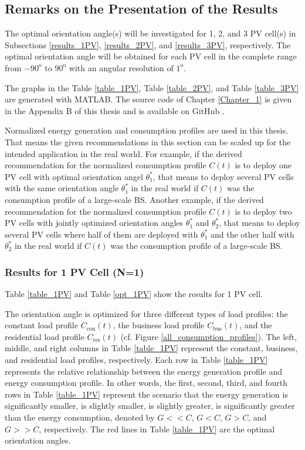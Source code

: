 \subsection{Remarks on the Presentation of the Results\label{results_load_shape}}
The optimal orientation angle(s) will be investigated for 1, 2, and 3 PV cell(s) in Subsections \ref{results_1PV}, \ref{results_2PV}, and \ref{results_3PV}, respectively. The optimal orientation angle will be obtained for each PV cell in the complete range from $- 90^\mathrm{o}$ to $90^\mathrm{o}$ with an angular resolution of $1^\mathrm{o}$.

The graphs in the Table \ref{table_1PV}, Table \ref{table_2PV}, and Table \ref{table_3PV} are generated with MATLAB. The source code of Chapter \ref{Chapter_1} is given in the Appendix B of this thesis and is available on GitHub \cite{DOBEN_GITHUB}.


Normalized energy generation and consumption profiles are used in this thesis. That means the given recommendations in this section can be scaled up for the intended application in the real world. For example, if the derived recommendation for the normalized consumption profile $C(t)$ is to deploy one PV cell with optimal orientation angel $\theta_1^*$,  
that means to deploy several PV cells with the same orientation angle $\theta_1^*$ in the real world if $C(t)$ was the consumption profile of a large-scale BS. Another example, if the derived recommendation for the normalized consumption profile $C(t)$ is to deploy two PV cells with jointly optimized orientation angles $\theta_1^*$ and $\theta_2^*$, that means to deploy several PV cells where half of them are deployed with $\theta_1^*$ and the other half with $\theta_2^*$ in the real world if $C(t)$ was the consumption profile of a large-scale BS. 


\subsubsection{Results for 1 PV Cell (N=1) \label{results_1PV}}

Table \ref{table_1PV} and Table \ref{opt_1PV} show the results for 1 PV cell.

The orientation angle is optimized for three different types of load profiles: the constant load profile $C_{\mathrm{con}}(t)$, the business load profile $C_{\mathrm{bus}}(t)$, and the residential load profile $C_{\mathrm{res}}(t)$ (cf. Figure \ref{all_consumption_profiles}). The left, middle, and right columns in Table \ref{table_1PV} represent the constant, business, and residential load profiles, respectively. Each row in Table \ref{table_1PV} represents the relative relationship between the energy generation profile and energy consumption profile. In other words, the first, second, third, and fourth rows in Table \ref{table_1PV} represent the scenario that the energy generation is significantly smaller, is slightly smaller, is slightly greater, is significantly greater than the energy consumption, denoted by $G<<C$, $G<C$, $G>C$, and $G>>C$, respectively. The red lines in Table \ref{table_1PV} are the optimal orientation angles.

